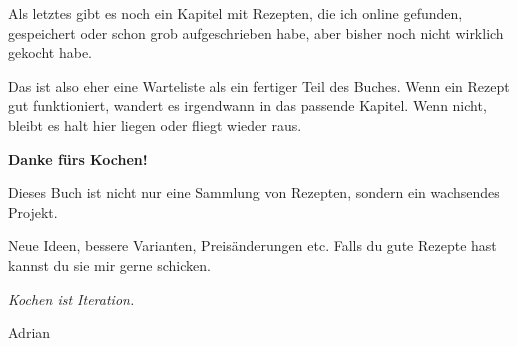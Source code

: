\documentclass[
  a4paper,
  twoside,
  11pt
]{article}
\begin{document}

Als letztes gibt es noch ein Kapitel mit Rezepten, die ich online gefunden, gespeichert oder schon grob aufgeschrieben habe, aber bisher noch nicht wirklich gekocht habe.

Das ist also eher eine Warteliste als ein fertiger Teil des Buches. Wenn ein Rezept gut funktioniert, wandert es irgendwann in das passende Kapitel. Wenn nicht, bleibt es halt hier liegen oder fliegt wieder raus.

\mylocaltableofcontents%
\newpage








\clearpage
{}

\begin{center}
\vspace{2cm}

{\Huge \textbf{Danke fürs Kochen!}}

\vspace{1cm}

Dieses Buch ist nicht nur eine Sammlung von Rezepten,  
sondern ein wachsendes Projekt.

\vspace{0.5cm}

Neue Ideen, bessere Varianten, Preisänderungen etc. Falls du gute Rezepte hast kannst du sie mir gerne schicken.

\vspace{1cm}

\textit{Kochen ist Iteration.}

\vfill

\Large
Adrian\\
\the\year%
\end{center}
\clearpage





\clearpage
\ClearShipoutPictureBG
{}
\printindex
\end{document}
